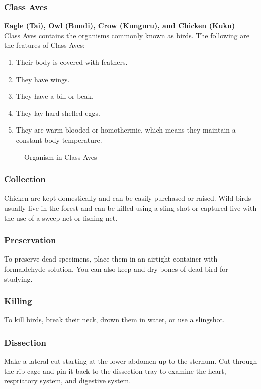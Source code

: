 \subsubsection{Class Aves}

\textbf{Eagle (Tai), Owl (Bundi), Crow (Kunguru), and Chicken (Kuku)}\\ Class Aves contains the organisms commonly known as birds. The following are the features of Class Aves:\\
\begin{enumerate}
\item{Their body is covered with feathers.}
\item{They have wings.}
\item{They have a bill or beak.}
\item{They lay hard-shelled eggs.}
\item{They are warm blooded or homothermic, which means they maintain a constant body temperature.}
\end{enumerate}

\begin{figure}
\begin{center}
\def\svgwidth{6cm}

\caption{Organism in Class Aves}
\label{fig:bird}
\end{center}
\end{figure}

\subsubsection{Collection}
Chicken are kept domestically and can be easily purchased or raised. Wild birds usually live in the forest and can be killed using a sling shot or captured live with the use of a sweep net or fishing net.

\subsubsection{Preservation} 
To preserve dead specimens, place them in an airtight container with formaldehyde solution. You can also keep and dry bones of dead bird for studying.

\subsubsection{Killing}
 To kill birds, break their neck, drown them in water, or use a slingshot.

\subsubsection{Dissection}
Make a lateral cut starting at the lower abdomen up to the sternum. Cut through the rib cage and pin it back to the dissection tray to examine the heart, respriatory system, and digestive system.

